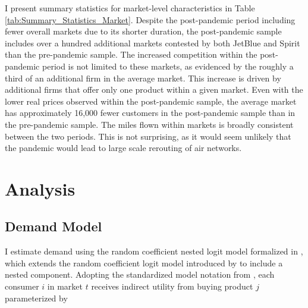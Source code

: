 \documentclass{article}
\begin{document}
    I present summary statistics for market-level characteristics in Table \ref{tab:Summary_Statistics_Market}. Despite the post-pandemic period including fewer overall markets due to its shorter duration, the post-pandemic sample includes over a hundred additional markets contested by both JetBlue and Spirit than the pre-pandemic sample. The increased competition within the post-pandemic period is not limited to these markets, as evidenced by the roughly a third of an additional firm in the average market. This increase is driven by additional firms that offer only one product within a given market. Even with the lower real prices observed within the post-pandemic sample, the average market has approximately 16,000 fewer customers in the post-pandemic sample than in the pre-pandemic sample. The miles flown within markets is broadly consistent between the two periods. This is not surprising, as it would seem unlikely that the pandemic would lead to large scale rerouting of air networks. 
 

	\section{Analysis}
	\label{sec:Analysis} 	 
 	 	 
	\subsection{Demand Model}
	\label{sec:Analysis_Demand}
	I estimate demand using the random coefficient nested logit model formalized in \citet{grigolon_nested_2014}, which extends the random coefficient logit model introduced by \citet{berry_automobile_1995} to include a nested component.  Adopting the standardized model notation from \citet{conlon_best_2020}, each consumer $i$ in market $t$ receives indirect utility from buying product $j$ parameterized by 
	
\end{document}
